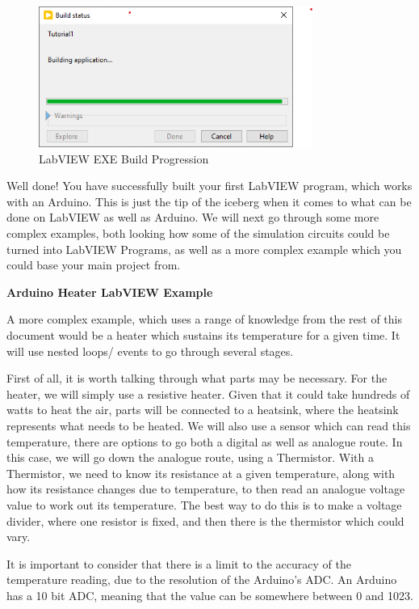 \documentclass[a4paper,11pt]{report}
\begin{document}
\begin{figure}[H]
\centering
\includegraphics[width=0.8\textwidth]{screenshots/labview44}
\caption{LabVIEW EXE Build Progression}
\end{figure}

Well done! You have successfully built your first LabVIEW program, which works with an Arduino. This is just the tip of the iceberg when it comes to what can be done on LabVIEW as well as Arduino. We will next go through some more complex examples, both looking how some of the simulation circuits could be turned into LabVIEW Programs, as well as a more complex example which you could base your main project from.

\textbf{Arduino Heater LabVIEW Example}

A more complex example, which uses a range of knowledge from the rest of this document would be a heater which sustains its temperature for a given time. It will use nested loops/ events to go through several stages.

First of all, it is worth talking through what parts may be necessary. For the heater, we will simply use a resistive heater. Given that it could take hundreds of watts to heat the air, parts will be connected to a heatsink, where the heatsink represents what needs to be heated. We will also use a sensor which can read this temperature, there are options to go both a digital as well as analogue route. In this case, we will go down the analogue route, using a Thermistor. With a Thermistor, we need to know its resistance at a given temperature, along with how its resistance changes due to temperature, to then read an analogue voltage value to work out its temperature. The best way to do this is to make a voltage divider, where one resistor is fixed, and then there is the thermistor which could vary.

It is important to consider that there is a limit to the accuracy of the temperature reading, due to the resolution of the Arduino's ADC. An Arduino has a 10 bit ADC, meaning that the value can be somewhere between 0 and 1023.
\end{document}
